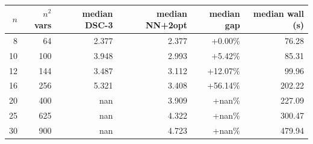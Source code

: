 \begin{tabular}{rrrrrr}
\toprule
$n$ & $n^2$ vars & median DSC-3 & median NN+2opt & median gap & median wall (s) \\
\midrule
8 & 64 & 2.377 & 2.377 & +0.00\% & 76.28 \\
10 & 100 & 3.948 & 2.993 & +5.42\% & 85.31 \\
12 & 144 & 3.487 & 3.112 & +12.07\% & 99.96 \\
16 & 256 & 5.321 & 3.408 & +56.14\% & 202.22 \\
20 & 400 & nan & 3.909 & +nan\% & 227.09 \\
25 & 625 & nan & 4.322 & +nan\% & 300.47 \\
30 & 900 & nan & 4.723 & +nan\% & 479.94 \\
\bottomrule
\end{tabular}

